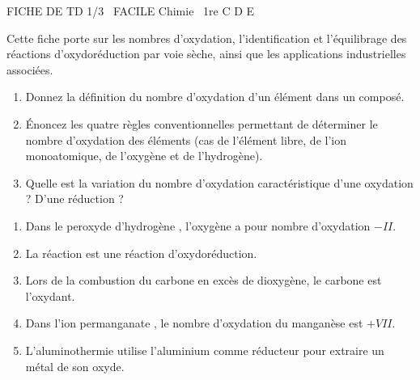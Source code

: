 \documentclass[11pt]{article}
\begin{document}
\begin{tcolorbox}[enhanced,colback=popink,colframe=popink,arc=10pt,boxrule=0pt,left=12pt,right=12pt,top=9pt,bottom=9pt]
{\color{white}\popxbold\small FICHE DE TD 1/3 \textbullet\ FACILE \hfill Chimie \textbullet\ 1re C D E\par}
\end{tcolorbox}
\vspace{4pt}
Cette fiche porte sur les nombres d'oxydation, l'identification et l'équilibrage des réactions d'oxydoréduction par voie sèche, ainsi que les applications industrielles associées.

\begin{exercice}
\begin{enumerate}
    \item Donnez la définition du nombre d'oxydation d'un élément dans un composé.
    \item Énoncez les quatre règles conventionnelles permettant de déterminer le nombre d'oxydation des éléments (cas de l'élément libre, de l'ion monoatomique, de l'oxygène et de l'hydrogène).
    \item Quelle est la variation du nombre d'oxydation caractéristique d'une oxydation ? D'une réduction ?
\end{enumerate}
\end{exercice}

\begin{exercice}
\begin{enumerate}
    \item Dans le peroxyde d'hydrogène , l'oxygène a pour nombre d'oxydation $-II$.
    \item La réaction  est une réaction d'oxydoréduction.
    \item Lors de la combustion du carbone en excès de dioxygène, le carbone est l'oxydant.
    \item Dans l'ion permanganate , le nombre d'oxydation du manganèse est $+VII$.
    \item L'aluminothermie utilise l'aluminium comme réducteur pour extraire un métal de son oxyde.
\end{enumerate}
\end{exercice}
\end{document}
